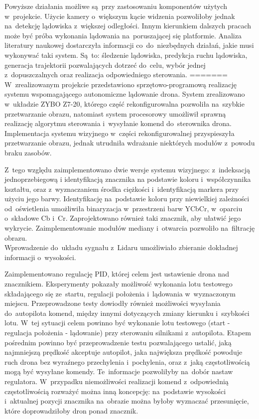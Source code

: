 Powyższe działania możliwe są~przy zastosowaniu komponentów użytych w~projekcie. 
Użycie kamery o~większym kącie widzenia pozwoliłoby jednak na~detekcję lądowiska z~większej odległości.
Innym kierunkiem dalszych pracach może być próba wykonania lądowania na~poruszającej się platformie. 
Analiza literatury naukowej dostarczyła informacji co~do~niezbędnych działań, jakie musi wykonywać taki system. 
Są~to: śledzenie lądowiska, predykcja ruchu lądowiska, generacja trajektorii pozwalających dotrzeć do~celu, wybór jednej z~dopuszczalnych oraz realizacja odpowiedniego sterowania.
=======
W~zrealizowanym projekcie przedstawiono sprzętowo-programową realizację systemu wspomagającego autonomiczne lądowanie drona. System zrealizowano w~układzie ZYBO Z7-20, którego część rekonfigurowalna pozwoliła na~szybkie przetwarzanie obrazu, natomiast system procesorowy umożliwił sprawną realizację algorytmu sterowania i~wysyłanie komend do~sterownika drona. Implementacja systemu wizyjnego w~części rekonfigurowalnej przyspieszyła przetwarzanie obrazu, jednak utrudniła wdrażanie niektórych modułów z~powodu braku zasobów.\par
Z~tego względu zaimplementowano dwie wersje systemu wizyjnego: z~indeksacją jednoprzebiegową i identyfikacją znacznika na podstawie koloru i~współczynnika kształtu, oraz z~wyznaczaniem środka ciężkości i~identyfikacją markera przy użyciu jego barwy. Identyfikację na~podstawie koloru przy niewielkiej zależności od~oświetlenia umożliwiła binaryzacja w~przestrzeni barw YCbCr, w~oparciu o~składowe Cb i~Cr. Zaprojektowano również taki znacznik, aby ułatwić jego wykrycie. Zaimplementowanie modułów mediany i~otwarcia pozwoliło na~filtrację obrazu.\\
Wprowadzenie do~układu sygnału z~Lidaru umożliwiało zbieranie dokładnej informacji o~wysokości.\par
Zaimplementowano regulację PID, której celem jest ustawienie drona nad znacznikiem. Eksperymenty pokazały możliwość wykonania lotu testowego składającego się ze~startu, regulacji położenia i~lądowania w~wyznaczonym miejscu.
Przeprowadzone testy dowiodły również możliwości wysyłania do~autopilota komend, między innymi dotyczących zmiany kierunku i~szybkości lotu. 
W~tej sytuacji celem powinno być wykonanie lotu testowego (start - regulacja położenia - lądowanie) przy sterowaniu silnikami z~autopilota. Etapem pośrednim powinno być przeprowadzenie testu pozwalającego ustalić, jaką najmniejszą prędkość akceptuje autopilot, jaka największa prędkość powoduje ruch drona bez wyraźnego przechylenia i~pochylenia, oraz z~jaką częstotliwością mogą być wysyłane komendy. Te~informacje pozwoliłyby na~dobór nastaw regulatora. W~przypadku niemożliwości realizacji komend z~odpowiednią częstotliwością rozważyć można inną koncepcję: na~podstawie wysokości i~aktualnej pozycji znacznika na~obrazie można byłoby wyznaczać przesunięcie, które doprowadziłoby dron ponad znacznik.\par
